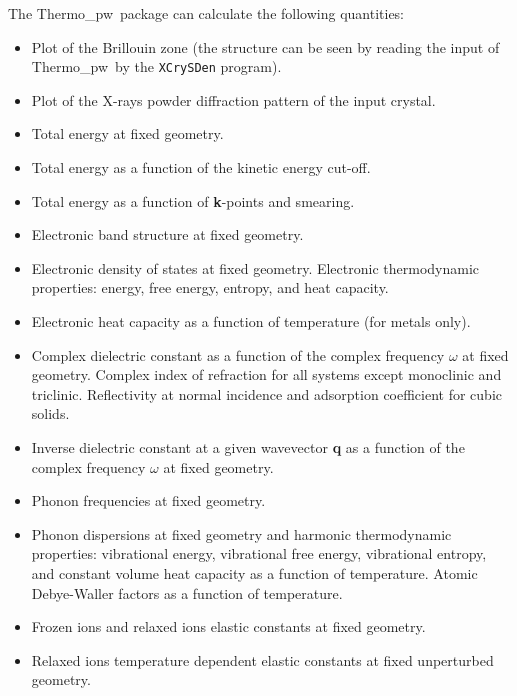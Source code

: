 \documentclass[12pt,a4paper,twoside]{report}
\def\thermo{{\sc Thermo\_pw}}
\begin{document}
The \thermo\ package can calculate the following quantities:
\begin{itemize}
\item Plot of the Brillouin zone (the structure can be seen by reading the
input of \thermo\ by the \texttt{XCrySDen} program).

\item Plot of the X-rays powder diffraction pattern of the input crystal.

\item Total energy at fixed geometry.

\item Total energy as a function of the kinetic energy cut-off.

\item Total energy as a function of {\bf k}-points and smearing.

\item Electronic band structure at fixed geometry.

\item Electronic density of states at fixed geometry. Electronic thermodynamic
properties: energy, free energy, entropy, and heat capacity. 

\item Electronic heat capacity as a function of temperature (for metals only).

\item Complex dielectric constant as a function of the complex
frequency $\omega$ at fixed geometry. Complex index of refraction for
all systems except monoclinic and triclinic. Reflectivity at normal
incidence and adsorption coefficient for cubic solids. 

\item Inverse dielectric constant at a given wavevector {\bf q} as a function 
of the complex frequency $\omega$ at fixed geometry.

\item Phonon frequencies at fixed geometry.

\item Phonon dispersions at fixed geometry and harmonic
thermodynamic properties: vibrational energy, vibrational free energy,
vibrational entropy, and constant volume heat capacity as a function of
temperature. Atomic Debye-Waller factors as a function of temperature.

\item Frozen ions and relaxed ions elastic constants at fixed geometry.

\item Relaxed ions temperature dependent elastic constants at fixed 
unperturbed geometry.


\end{itemize}
\end{document}
